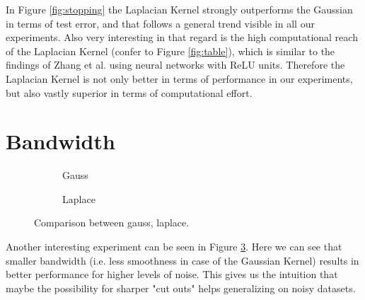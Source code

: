 In Figure \ref{fig:stopping} the Laplacian Kernel strongly outperforms the Gaussian in terms of test error, and that follows a general trend visible in all our experiments. Also very interesting in that regard is the high computational reach of the Laplacian Kernel (confer to Figure \ref{fig:table}), which is similar to the findings of Zhang et al. \cite{zhang2017} using neural networks with ReLU units. Therefore the Laplacian Kernel is not only better in terms of performance in our experiments, but also vastly superior in terms of computational effort.



\section{Bandwidth}

\begin{figure}[!htb]
\centering
\begin{subfigure}{0.42\textwidth}
\caption{Gauss} \label{fig:bsa}
\end{subfigure}
\hspace*{\fill} %
\begin{subfigure}{0.42\textwidth}
\caption{Laplace} \label{fig:bb}
\end{subfigure}
\caption{Comparison between gauss, laplace.} \label{fig:bandwidth}
\end{figure}

Another interesting experiment can be seen in Figure \ref{fig:bandwidth}. Here we can see that smaller bandwidth (i.e. less smoothness in case of the Gaussian Kernel) results in better performance for higher levels of noise.  This gives us the intuition that maybe the possibility for sharper "cut outs" helps generalizing on noisy datasets.
